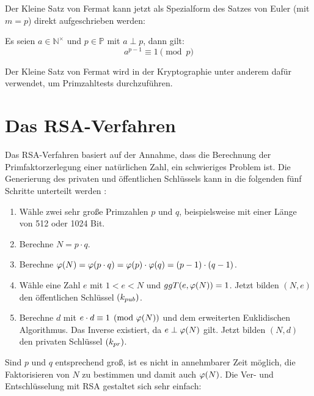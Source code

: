 \noindent
Der Kleine Satz von Fermat kann jetzt als Spezialform des Satzes von Euler (mit $m = p$) direkt
aufgeschrieben werden:

\begin{satz}
  Es seien $a \in \mathbb{N}^\times$ und $p \in \mathbb{P}$ mit $a \perp p$, dann gilt:
  \begin{equation*}
    a^{p-1} \equiv 1 \pmod{p}
  \end{equation*}
\end{satz}

\noindent
Der Kleine Satz von Fermat wird in der Kryptographie unter anderem dafür verwendet,
um Primzahltests durchzuführen.

\section{Das RSA-Verfahren}
Das RSA-Verfahren basiert auf der Annahme, dass die Berechnung der Primfaktorzerlegung
einer natürlichen Zahl, ein schwieriges Problem ist.
Die Generierung des privaten und öffentlichen Schlüssels kann in die
folgenden fünf Schritte unterteilt werden \parencite[176]{BOOK:crypto}:

\begin{definition}\mbox{}
  \begin{enumerate}
    \item Wähle zwei sehr große Primzahlen $p$ und $q$, beispielsweise mit einer Länge
          von 512 oder 1024 Bit.
    \item Berechne $N = p \cdot q$.
    \item Berechne $\varphi(N) = \varphi(p \cdot q) = \varphi(p) \cdot \varphi(q) = (p-1) \cdot (q-1)$.
    \item Wähle eine Zahl $e$ mit $1 < e < N$ und $ggT(e,\varphi(N)) = 1$. Jetzt bilden
          $(N,e)$ den öffentlichen Schlüssel $(k_{pub})$.
    \item Berechne $d$ mit $e \cdot d \equiv 1 \pmod{\varphi(N)}$ und dem erweiterten
          Euklidischen Algorithmus. Das Inverse existiert, da $e \perp \varphi(N)$ gilt. Jetzt bilden
          $(N,d)$ den privaten Schlüssel $(k_{pr})$.
  \end{enumerate}
\end{definition}

\noindent
Sind $p$ und $q$ entsprechend groß, ist es nicht in annehmbarer Zeit möglich, die Faktorisieren
von $N$ zu bestimmen und damit auch $\varphi(N)$. Die Ver- und Entschlüsselung mit RSA
gestaltet sich sehr einfach:

